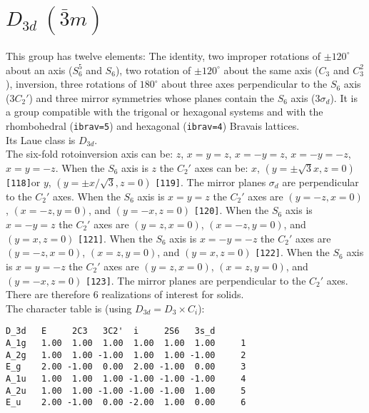 \documentclass[12pt,a4paper,twoside]{report}
\begin{document}
\newpage
{\color{coral}\section{$D_{3d}\ (\bar 3m)$}} 
\color{black}
This group has twelve elements: The identity, two improper rotations 
of $\pm120^\circ$ about an axis ($S_6^5$ and $S_6$), two rotation of 
$\pm120^\circ$ about the same axis ($C_3$ and $C_3^2$), inversion,
three rotations of $180^\circ$ about three axes perpendicular to the 
$S_6$ axis ($3C_2'$) and three mirror symmetries whose planes contain 
the $S_6$ axis ($3\sigma_d$).
It is a group compatible with the trigonal or hexagonal systems and with the  
rhombohedral (\texttt{ibrav=5}) and hexagonal (\texttt{ibrav=4}) Bravais lattices. \\
Its Laue class is $D_{3d}$. \\
The six-fold rotoinversion axis can be: $z$, $x=y=z$, $x=-y=z$,
$x=-y=-z$, $x=y=-z$.
When the $S_6$ axis is $z$ the $C_2'$ axes can be:
$x$, $(y=\pm\sqrt{3}x, z=0)$ \texttt{[118]}or $y$, $(y=\pm x/\sqrt{3}, z=0)$
\texttt{[119]}. The mirror
planes $\sigma_d$ are perpendicular to the $C_2'$ axes.
When the $S_6$ axis is $x=y=z$ the $C_2'$ axes are $(y=-z, x=0)$, 
$(x=-z, y=0)$, and $(y=-x, z=0)$ \texttt{[120]}. 
When the $S_6$ axis is $x=-y=z$ 
the $C_2'$ axes are $(y=z, x=0)$, $(x=-z, y=0)$, and $(y=x, z=0)$
\texttt{[121]}. 
When the $S_6$ axis is $x=-y=-z$ the $C_2'$ axes are $(y=-z, x=0)$, 
$(x=z, y=0)$, and $(y=x, z=0)$ \texttt{[122]}. When the $S_6$ axis is 
$x=y=-z$ the $C_2'$ axes are $(y=z, x=0)$, $(x=z, y=0)$, and $(y=-x, z=0)$
\texttt{[123]}. The mirror planes are perpendicular to the $C_2'$ axes.
There are therefore $6$ realizations of interest for solids. \\
The character table is (using $D_{3d}=D_3 \times C_i$):

\begin{tcolorbox}
\begin{footnotesize}
\begin{verbatim}
D_3d   E     2C3   3C2'  i     2S6   3s_d 
A_1g   1.00  1.00  1.00  1.00  1.00  1.00     1
A_2g   1.00  1.00 -1.00  1.00  1.00 -1.00     2
E_g    2.00 -1.00  0.00  2.00 -1.00  0.00     3
A_1u   1.00  1.00  1.00 -1.00 -1.00 -1.00     4
A_2u   1.00  1.00 -1.00 -1.00 -1.00  1.00     5
E_u    2.00 -1.00  0.00 -2.00  1.00  0.00     6
\end{verbatim}
\end{footnotesize}
\end{tcolorbox}
\end{document}
